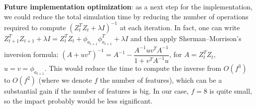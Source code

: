 \documentclass[a4paper]{article}
\begin{document}
\textbf{Future implementation optimization}: as a next step for the implementation, we could reduce the total simulation time by reducing the number of operations required to compute $(Z_t^T Z_t  + \lambda I)^{-1}$ at each iteration. In fact, one can write $Z_{t+1}^T Z_{t+1}  + \lambda I = Z_t^T Z_t + \phi_{a_{t+1}}\phi_{a_{t+1}}^T + \lambda I$ and then apply Sherman–Morrison's inversion formula\cite{InvertSum}: $(A + uv^T)^{-1} = A^{-1} - \dfrac{A^{-1}uv^TA^{-1}}{1 + v^TA^{-1}u}$, for $A = Z_t^T Z_t$, $u = v = \phi_{a_{t+1}}$. This would reduce the time to compute the inverse from $O(f^3)$ to $O(f^2)$ (where we denote $f$ the number of features), which can be a substantial gain if the number of features is big. In our case, $f= 8$ is quite small, so the impact probably would be less significant.




\end{document}
